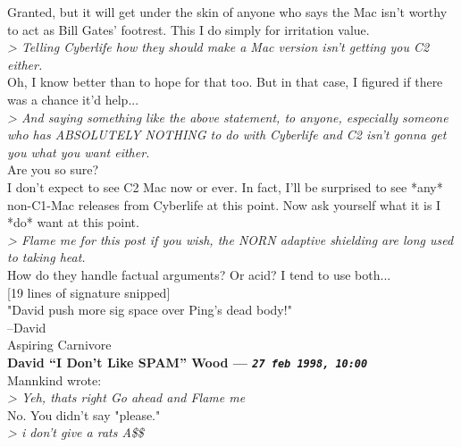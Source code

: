 \documentclass[11pt,twoside,a4paper]{article}
\begin{document}
\begin{multicols*}{2}
Granted, but it will get under the skin of anyone who says the Mac isn't worthy to act as Bill Gates' footrest. This I do simply for irritation value.~\\

\emph{> Telling Cyberlife how they should make a Mac version isn't getting you C2 either.}~\\

Oh, I know better than to hope for that too. But in that case, I figured if there was a chance it'd help...~\\

\emph{> And saying something like the above statement, to anyone, especially someone who has ABSOLUTELY NOTHING to do with Cyberlife and C2 isn't gonna get you what you want either.}~\\

Are you so sure?~\\

I don't expect to see C2 Mac now or ever. In fact, I'll be surprised to see *any* non-C1-Mac releases from Cyberlife at this point. Now ask yourself what it is I *do* want at this point.~\\

\emph{> Flame me for this post if you wish, the NORN adaptive shielding are long used to taking heat.}~\\

How do they handle factual arguments? Or acid? I tend to use both...~\\

[19 lines of signature snipped]~\\

"David push more sig space over Ping's dead body!"~\\

--David~\\
Aspiring Carnivore~\\

 
		
	
		
\textbf{David ``I Don't Like SPAM'' Wood --- \emph{\texttt{27 feb 1998, 10:00}}}~\\

Mannkind wrote:~\\
\emph{> Yeh, thats right Go ahead and Flame me}~\\

No. You didn't say "please."~\\

\emph{> i don't give a rats A\$\$}~\\


\end{multicols*}
\end{document}
